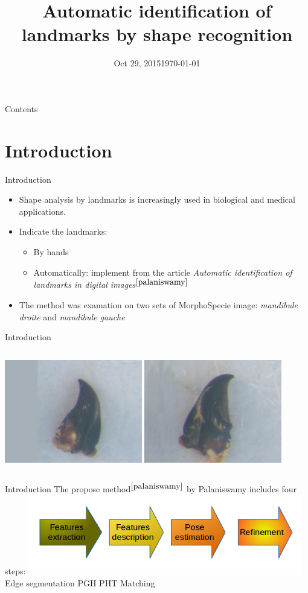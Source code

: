 \documentclass{beamer}
\title{Automatic identification of landmarks by shape recognition}
\date{Oct 29, 2015}
\date{\today}
\begin{document}
\frame{\titlepage}
\begin{frame}{Contents}
	\tableofcontents
\end{frame}
\section{Introduction}
\begin{frame}{Introduction}
	\begin{itemize}
		\item Shape analysis by landmarks is increasingly used in biological and medical applications.
		\item Indicate the landmarks:
			\begin{itemize}
				\item By hands
				\item Automatically: implement from the article \textit{Automatic identification of landmarks in digital images$^{\cite{palaniswamy}}$}
			\end{itemize}			
		\item The method was examation on two sets of MorphoSpecie image: \textit{mandibule droite} and \textit{mandibule gauche}  
	\end{itemize}
\end{frame}
\begin{frame}{Introduction}
	\begin{columns}[c]
		\includegraphics[height=4.5cm]{images/model28.JPG}
		\includegraphics[height=4.5cm]{images/modelmg37.JPG}
	\end{columns}
\end{frame}
\begin{frame}{Introduction}
	The propose method$^{\cite{palaniswamy}}$ by Palaniswamy includes four steps:
	\includegraphics[height=3.5cm]{images/flow.png}
	Edge segmentation         PGH             PHT       Matching
\end{frame}
\end{document}
